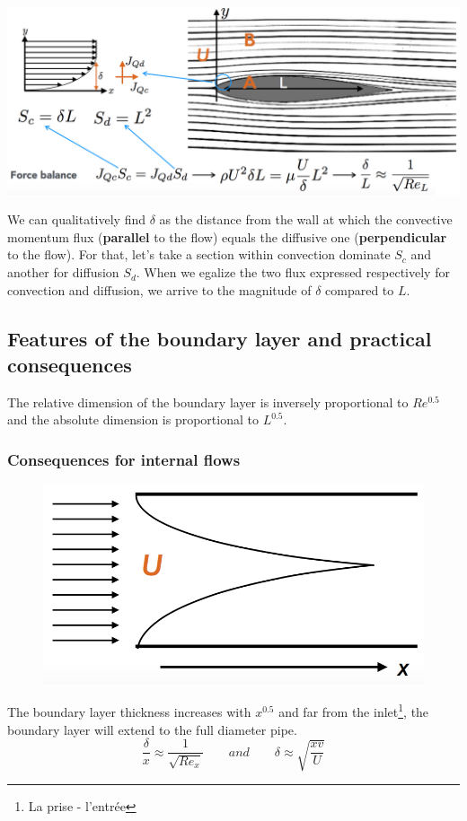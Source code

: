 \begin{center}
	\includegraphics[scale=0.4]{ch1/12}
\end{center}
We can qualitatively find $\delta$ as the distance from the wall at which the convective momentum flux (\textbf{parallel} to the flow) equals the diffusive one (\textbf{perpendicular} to the flow). For that, let's take a section within convection dominate $S_c$ and another for diffusion $S_d$. When we egalize the two flux expressed respectively for convection and diffusion, we arrive to the magnitude of $\delta$ compared to $L$.
	
\subsection{Features of the boundary layer and practical consequences}
The relative dimension of the boundary layer is inversely proportional to $Re^{0.5}$ and the absolute dimension is proportional to $L^{0.5}$.

\subsubsection{Consequences for internal flows}
\begin{figure}
	\vspace{-5mm}
	\includegraphics[scale=0.3]{ch1/13}
\end{figure}
The boundary layer thickness increases with $x^{0.5}$ and far from the inlet\footnote{La prise - l'entrée}, the boundary layer will extend to the full diameter pipe. 
\begin{equation}
	\frac{\delta}{x} \approx \frac{1}{\sqrt{Re_x}} \qquad and \qquad \delta \approx \sqrt{\frac{xv}{U}}
\end{equation}
	
